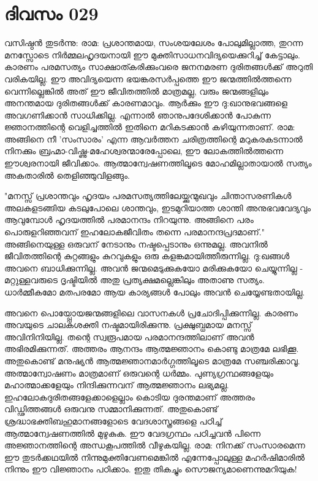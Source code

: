  
\section{ദിവസം 029}


വസിഷ്ഠന്‍ തുടര്‍ന്നു: രാമ: പ്രശാന്തമായ, സംശയലേശം പോലുമില്ലാത്ത, തുറന്ന മനസ്സോടെ നിര്‍മ്മലഹൃദയനായി ഈ മുക്തിസാധനവിദ്യയെക്കുറിച്ച്‌ കേട്ടാലും. കാരണം പരമസത്യം സാക്ഷാത്കരിക്കുംവരെ ജനനമരണ ദുരിതങ്ങള്‍ക്ക്‌ അറുതി വരികയില്ല. ഈ അവിദ്യയെന്ന ഭയങ്കരസര്‍പ്പത്തെ ഈ ജന്മത്തില്‍ത്തന്നെ വെന്നില്ലെങ്കില്‍ അത്‌ ഈ ജീവിതത്തില്‍ മാത്രമല്ല, വരും ജന്മങ്ങളിലും അനന്തമായ ദുരിതങ്ങള്‍ക്ക്‌ കാരണമാവും. ആര്‍ക്കും ഈ ദു:ഖാനുഭവങ്ങളെ അവഗണിക്കാന്‍ സാധിക്കില്ല. എന്നാല്‍ ഞാനുപദേശിക്കാന്‍ പോകുന്ന ജ്ഞാനത്തിന്റെ വെളിച്ചത്തില്‍ ഇതിനെ മറികടക്കാന്‍ കഴിയുന്നതാണ്‌. രാമ: അങ്ങിനെ നീ 'സംസാരം' എന്ന ആവര്‍ത്തന ചരിത്രത്തിന്റെ മറുകരകടന്നാല്‍ നിനക്കും ബ്രഹ്മാ-വിഷ്ണു-മഹേശ്വരന്മാരേപ്പോലെ, ഈ ലോകത്തില്‍ത്തന്നെ ഈശ്വരനായി ജീവിക്കാം. ആത്മാന്വേഷണത്തിലൂടെ മോഹമില്ലാതായാല്‍ സത്യം അകതാരില്‍ തെളിഞ്ഞുവിളങ്ങും. 

"മനസ്സ്‌ പ്രശാന്തവും ഹൃദയം പരമസത്യത്തിലേയ്ക്കുന്മുഖവും ചിന്താസരണികള്‍ അലകളടങ്ങിയ കടലുപോലെ ശാന്തവും, ഇടമുറിയാത്ത ശാന്തി അനുഭവവേദ്യവും ആവുമ്പോള്‍ ഹൃദയത്തില്‍ പരമാനന്ദം നിറയുന്നു. അങ്ങിനെ പരം പൊരുളറിഞ്ഞവന്‌ ഇഹലോകജീവിതം തന്നെ പരമാനന്ദപ്രദമാണ്‌." അങ്ങിനെയുള്ള ഒരുവന്‌ നേടാനും നഷ്ടപ്പെടാനും ഒന്നുമല്ല. അവനില്‍ ജീവിതത്തിന്റെ കുറ്റങ്ങളും കുറവുകളും ഒരു കളങ്കമായിത്തീരുന്നില്ല. ദു:ഖങ്ങള്‍ അവനെ ബാധിക്കുന്നില്ല. അവന്‍ ജന്മമെടുക്കുകയോ മരിക്കുകയോ ചെയ്യുന്നില്ല - മറ്റുള്ളവരുടെ ദൃഷ്ടിയില്‍ അതു പ്രത്യക്ഷമല്ലെങ്കിലും അതാണു സത്യം. ധാര്‍മ്മീകമോ മതപരമോ ആയ കാര്യങ്ങള്‍ പോലും അവന്‍ ചെയ്യേണ്ടതായില്ല.

അവനെ പൊയ്പ്പോയജന്മങ്ങളിലെ വാസനകള്‍ പ്രചോദിപ്പിക്കുന്നില്ല. കാരണം അവയുടെ ചാലകശക്തി നഷ്ടമായിരിക്കുന്നു. പ്രക്ഷുബ്ധമായ മനസ്സ്‌ അവിനിനിയില്ല. തന്റെ സ്വരൂപമായ പരമാനന്ദത്തിലാണ്‌ അവന്‍ അഭിരമിക്കുന്നത്‌. അത്തരം ആനന്ദം ആത്മജ്ഞാനം കൊണ്ടു മാത്രമേ ലഭിക്കൂ. അതുകൊണ്ട്‌ മനുഷ്യന്‍ ആത്മജ്ഞാനമാര്‍ഗ്ഗത്തിലൂടെ മാത്രമേ സഞ്ചരിക്കാവൂ. അത്മാന്വോഷണം മാത്രമാണ്‌ ഒരുവന്റെ ധര്‍മ്മം. പുണ്യഗ്രന്ഥങ്ങളേയും മഹാത്മാക്കളേയും നിന്ദിക്കുന്നവന്‌ ആത്മജ്ഞാനം ലഭ്യമല്ല. ഇഹലോകദുരിതങ്ങളേക്കാളെല്ലാം കൊടിയ ദുരന്തമാണ്‌ അത്തരം വിഡ്ഢിത്തങ്ങള്‍ ഒരുവനു സമ്മാനിക്കുന്നത്‌. അതുകൊണ്ട്‌ ശ്രദ്ധാഭക്തിബഹുമാനങ്ങളോടെ വേദശാസ്ത്രങ്ങളെ പഠിച്ച്‌ ആത്മാന്വേഷണത്തില്‍ മുഴുകുക. ഈ വേദഗ്രന്ഥം പഠിച്ചവന്‍ പിന്നെ അജ്ഞാനത്തിന്റെ അന്ധകൂപത്തില്‍ വീഴുകയില്ല. രാമ: നിനക്ക്‌ സംസാരമെന്ന ഈ തുടര്‍ക്കഥയില്‍ നിന്നുമുക്തിവേണമെങ്കില്‍ എന്നേപ്പോലുള്ള മഹര്‍ഷിമാരില്‍ നിന്നും ഈ വിജ്ഞാനം പഠിക്കാം. ഇതു തികച്ചും സൌജന്യമാണെന്നുമറിയുക!
